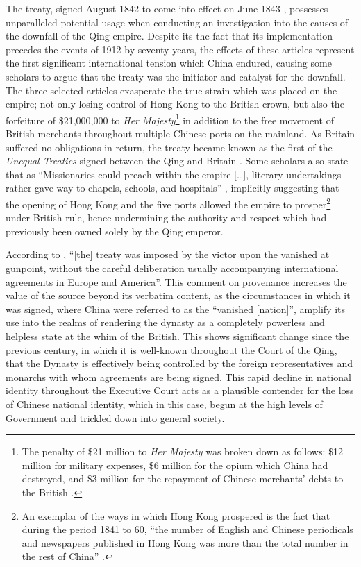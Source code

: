 \documentclass[a4paper,oneside]{article}
\begin{document}

The treaty, signed  August 1842 to come into effect on  June
1843 \autocite{Saw:1975}, possesses unparalleled potential usage when conducting
an investigation into the causes of the downfall of the Qing empire. Despite its
the fact that its implementation precedes the events of 1912 by seventy years,
the effects of these articles represent the first significant international
tension which China endured, causing some scholars to argue that the treaty was
the initiator and catalyst for the downfall. The three selected articles
exasperate the true strain which was placed on the empire; not only losing
control of Hong Kong to the British crown, but also the forfeiture of
\$21,000,000 to \textit{Her Majesty}\footnote{The penalty of \$21 million to
\textit{Her Majesty} was broken down as follows: \$12 million for military
expenses, \$6 million for the opium which China had destroyed, and \$3 million
for the repayment of Chinese merchants' debts to the British
\autocite{Hsu:1999}.} in addition to the free movement of British merchants
throughout multiple Chinese ports on the mainland. As Britain suffered no
obligations in return, the treaty became known as the first of the
\textit{Unequal Treaties} signed between the Qing and Britain
\autocite{Hoe:1999}. Some scholars also state that as ``Missionaries could
preach within the empire [\ldots], literary undertakings rather gave way to
chapels, schools, and hospitals'' \autocite{Britton:1933}, implicitly suggesting
that the opening of Hong Kong and the five ports allowed the empire to
prosper\footnote{An exemplar of the ways in which Hong Kong prospered is the
fact that during the period 1841 to 60, ``the number of English and Chinese
periodicals and newspapers published in Hong Kong was more than the total number
in the rest of China'' \autocite{Huang:2001}.} under British rule, hence
undermining the authority and respect which had previously been owned solely by
the Qing emperor.

According to \autocite{Hsu:1999}, ``[the] treaty was imposed by the victor upon
the vanished at gunpoint, without the careful deliberation usually accompanying
international agreements in Europe and America''.  This comment on provenance
increases the value of the source beyond its verbatim content, as the
circumstances in which it was signed, where China were referred to as the
``vanished [nation]'', amplify its use into the realms of rendering the dynasty
as a completely powerless and helpless state at the whim of the British. This
shows significant change since the previous century, in which it is well-known
throughout the Court of the Qing, that the Dynasty is effectively being
controlled by the foreign representatives and monarchs with whom agreements are
being signed. This rapid decline in national identity throughout the Executive
Court acts as a plausible contender for the loss of Chinese national identity,
which in this case, begun at the high levels of Government and trickled down
into general society.
\end{document}
